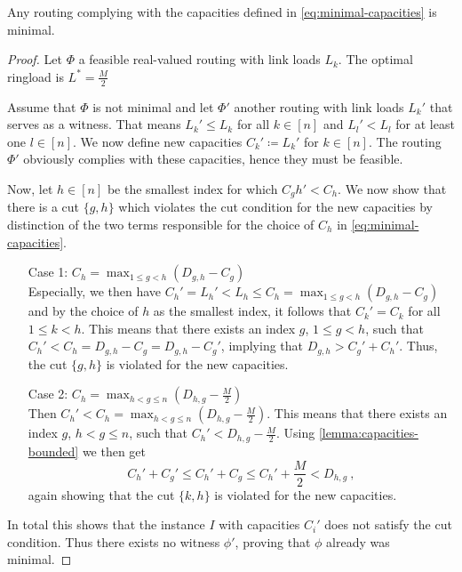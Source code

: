 \begin{theorem}
	\label{theo:routing-with-capacities-is-minimal}
	Any routing complying with the capacities defined in \cref{eq:minimal-capacities} is minimal.
\end{theorem}
\begin{proof}	
	Let $\Phi$ a feasible real-valued routing with link loads $L_k$.
	The optimal ringload is $L^\ast = \frac{M}{2}$
	
	Assume that $\Phi$ is not minimal and let $\Phi'$ another routing with link loads $L_k'$ that serves as a witness.
	That means $L_k' \leq L_k$ for all $k \in [n]$ and $L_l' < L_l$ for at least one $l \in [n]$.
	We now define new capacities $C_k' \coloneqq L_k'$ for $k \in [n]$.
	The routing $\Phi'$ obviously complies with these capacities, hence they must be feasible.
	
	Now, let $h \in [n]$ be the smallest index for which $C_gh' < C_h$.
	We now show that there is a cut $\{g, h\}$ which violates the cut condition for the new capacities by distinction of the two terms responsible for the choice of $C_h$ in \cref{eq:minimal-capacities}.
	\begin{enumerate}[align=left]
		\item[Case 1: $C_h = \max_{1 \leq g < h}(D_{g,h} - C_g)$]{\mbox{}\\
			Especially, we then have $C_h'= L_h' < L_h \leq C_h = \max_{1 \leq g < h}(D_{g, h} - C_g)$ and by the choice of $h$ as the smallest index, it follows that $C_k' = C_k$ for all $1 \leq k < h$.
			This means that there exists an index $g$, $1 \leq g < h$, such that $C_h' < C_h = D_{g, h} - C_g = D_{g, h} - C_g'$, implying that $D_{g, h} > C_g' + C_h'$.
			Thus, the cut $\{g, h\}$ is violated for the new capacities.
		}
		\item[Case 2: $C_h = \max_{h < g \leq n}(D_{h, g} - \frac{M}{2})$]{\mbox{}\\
			Then $C_h' < C_h = \max_{h < g \leq n}(D_{h,g} - \frac{M}{2})$.
			This means that there exists an index $g$, $h < g \leq n$, such that $C_h' < D_{h,g} - \frac{M}{2}$.
			Using \cref{lemma:capacities-bounded} we then get 
			\begin{equation}
				C_h' + C_g' \leq C_h' + C_g \leq C_h' + \frac{M}{2} < D_{h, g} \ ,
			\end{equation}
			again showing that the cut $\{k, h\}$ is violated for the new capacities.
		}
	\end{enumerate}
	In total this shows that the instance $I$ with capacities $C_i'$ does not satisfy the cut condition.
	Thus there exists no witness $\phi'$, proving that $\phi$ already was minimal.
\end{proof}

